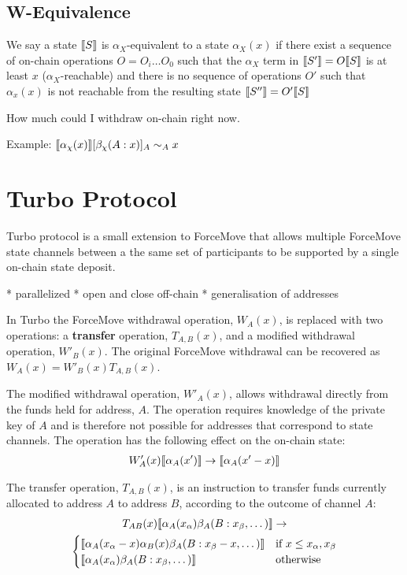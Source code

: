 \subsection{W-Equivalence}

We say a state $\llbracket S \rrbracket$ is $\alpha_X$-equivalent to a state $\alpha_X(x)$ if there exist
a sequence of on-chain operations $O = O_i \dots O_0$ such that the $\alpha_X$ term in
$\llbracket S' \rrbracket = O\llbracket S \rrbracket$ is at least $x$ ($\alpha_X$-reachable) and there is no sequence of
operations $O'$ such that $\alpha_x(x)$ is not reachable from the resulting state
$\llbracket S'' \rrbracket = O'\llbracket S \rrbracket$ 

How much could I withdraw on-chain right now.

Example: $\llbracket \alpha_\chi(x) \rrbracket[\beta_\chi(A: x)]_A \sim_A x$

\section{Turbo Protocol}

Turbo protocol is a small extension to ForceMove that allows multiple ForceMove state
channels between a the same set of participants to be supported by a single on-chain
state deposit.

* parallelized
* open and close off-chain
* generalisation of addresses

In Turbo the ForceMove withdrawal operation, $W_A(x)$, is replaced with two operations: a
\textbf{transfer} operation, $T_{A,B}(x)$, and a modified withdrawal operation, $W'_B(x)$.
The original ForceMove withdrawal can be recovered as $W_A(x) = W'_B(x)T_{A,B}(x)$.

The modified withdrawal operation, $W'_A(x)$, allows withdrawal directly from the funds
held for address, $A$. The operation requires knowledge of the private key of $A$ and is
therefore not possible for addresses that correspond to state channels. The operation has
the following effect on the on-chain state:
\begin{align*}
W'_A(x) \llbracket \alpha_A(x') \rrbracket \rightarrow \llbracket \alpha_A(x'-x) \rrbracket
\end{align*}

The transfer operation, $T_{A,B}(x)$, is an instruction to transfer funds currently allocated
to address $A$ to address $B$, according to the outcome of channel $A$:
\begin{multline*}
T_{AB}(x) \llbracket \alpha_A(x_\alpha)\beta_A(B:x_\beta, \dots) \rrbracket \rightarrow \\
  \begin{cases}
      \llbracket \alpha_A(x_\alpha - x)\alpha_B(x)\beta_A(B:x_\beta - x, \dots) \rrbracket & 
      \text{if } x \leq x_\alpha, x_\beta \\
      \llbracket \alpha_A(x_\alpha)\beta_A(B:x_\beta, \dots) \rrbracket &
      \text{otherwise}
  \end{cases}
\end{multline*}



